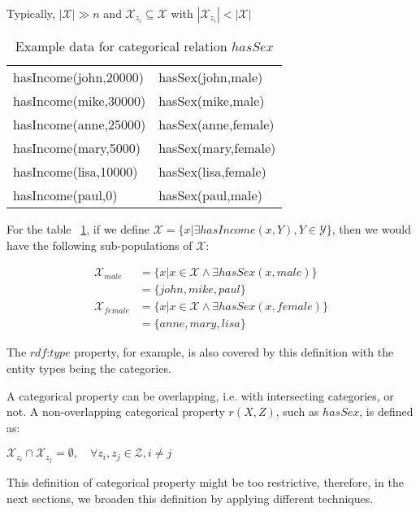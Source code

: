 Typically, $|\mathcal{X}| \gg n$ and $\mathcal{X}_{z_i} \subseteq
\mathcal{X}$ with $|\mathcal{X}_{z_i}| < |\mathcal{X}|$

\begin{table}[h!]
 \label{tab:cat1}
 \caption{Example data for categorical relation $hasSex$}
 \begin{center}
  \begin{tabular}{*{2}{l}}

    hasIncome(john,20000) & hasSex(john,male) 	\\
    hasIncome(mike,30000) & hasSex(mike,male) 	\\
    hasIncome(anne,25000) & hasSex(anne,female) 	\\
    hasIncome(mary,5000)  & hasSex(mary,female) 	\\
    hasIncome(lisa,10000) & hasSex(lisa,female)	\\
    hasIncome(paul,0)	  & hasSex(paul,male)	\\
  \end{tabular}
  \end{center}
\end{table}
  
For the table ~\ref{tab:cat1}, if we define $\mathcal{X}=\{ x|\exists hasIncome(x,Y), Y \in \mathcal{Y} \}$, then we
would
have the following sub-populations of $\mathcal{X}$:

\begin{align*}
 \mathcal{X}_{male}&=\{ x|x \in \mathcal{X} \wedge \exists hasSex(x,male)\} \\
  &=\{john,mike,paul\} \\
\mathcal{X}_{female}&=\{ x|x \in \mathcal{X} \wedge \exists hasSex(x,female)\} \\
  &=\{anne,mary,lisa\}
\end{align*}


The $rdf$:$type$ property, for example, is also covered by this definition with the entity types being the categories.

A categorical property can be overlapping, i.e. with intersecting categories, or not. A non-overlapping categorical
property $r(X,Z)$, such as $hasSex$, is defined as:

\begin{center}
$\mathcal{X}_{z_i} \cap \mathcal{X}_{z_j} = \emptyset, \quad \forall z_i,z_j \in \mathcal{Z}, i \neq j$ 
\end{center}

This definition of categorical property might be too restrictive, therefore, in the next sections, we broaden this
definition by applying different techniques.

